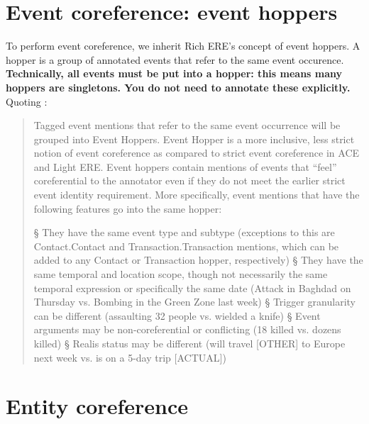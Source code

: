 \section{Event coreference: event hoppers}

To perform event coreference, we inherit Rich ERE's concept of event hoppers. \cite{LDC2016.rich_ere}
A hopper is a group of annotated events that refer to the same event occurence.
\textbf{Technically, all events must be put into a hopper: this means many hoppers are singletons.
You do not need to annotate these explicitly.}
Quoting \cite{LDC2016.rich_ere}:

\begin{quote}
    Tagged event mentions that refer to the same event occurrence will be grouped into Event Hoppers. Event Hopper is a more inclusive, less strict notion of event coreference as compared to strict event coreference in ACE and Light ERE. Event hoppers contain mentions of events that “feel” coreferential to the annotator even if they do not meet the earlier strict event identity requirement. More specifically, event mentions that have the following features go into the same hopper:

    \begin{el}
        § They have the same event type and subtype (exceptions to this are Contact.Contact and Transaction.Transaction mentions, which can be added to any Contact or Transaction hopper, respectively)
        § They have the same temporal and location scope, though not necessarily the same temporal expression or specifically the same date (Attack in Baghdad on Thursday vs. Bombing in the Green Zone last week)
        § Trigger granularity can be different (assaulting 32 people vs. wielded a knife)
        § Event arguments may be non-coreferential or conflicting (18 killed vs. dozens killed)
        § Realis status may be different (will travel [OTHER] to Europe next week vs. is on a 5-day trip [ACTUAL])
    \end{el}
\end{quote}

\section{Entity coreference}

